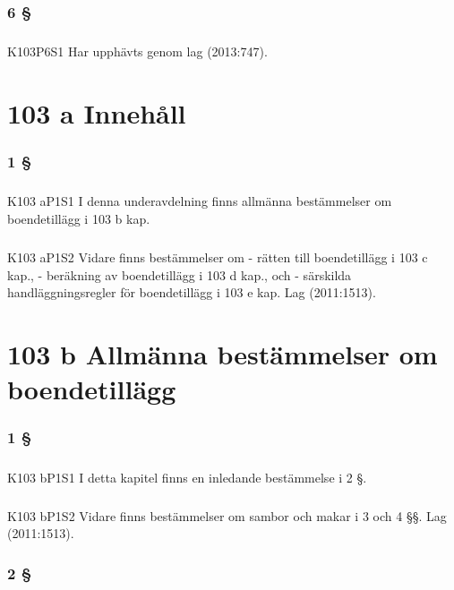 \documentclass[a4paper,notitlepage,openany,10pt]{book}
\begin{document}
\subsection*{6 §}
\paragraph*{}
{\tiny K103P6S1}
Har upphävts genom
lag (2013:747).
\chapter*{103 a Innehåll}
\subsection*{1 §}
\paragraph*{}
{\tiny K103 aP1S1}
I denna underavdelning finns allmänna bestämmelser om boendetillägg i 103 b kap.
\paragraph*{}
{\tiny K103 aP1S2}
Vidare finns bestämmelser om
\newline - rätten till boendetillägg i 103 c kap.,
\newline - beräkning av boendetillägg i 103 d kap., och
\newline - särskilda handläggningsregler för boendetillägg i 103 e kap.
Lag (2011:1513).
\chapter*{103 b Allmänna bestämmelser om boendetillägg}
\subsection*{1 §}
\paragraph*{}
{\tiny K103 bP1S1}
I detta kapitel finns en inledande bestämmelse i 2 §.
\paragraph*{}
{\tiny K103 bP1S2}
Vidare finns bestämmelser om sambor och makar i 3 och 4 §§.
Lag (2011:1513).
\subsection*{2 §}
\end{document}
